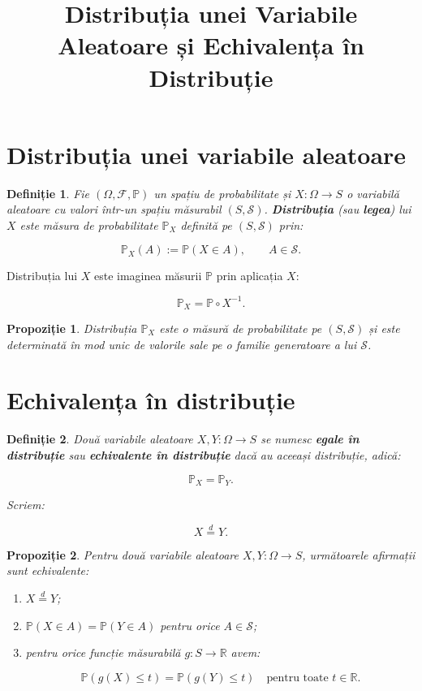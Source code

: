 \documentclass[12pt]{article}
\title{Distribuția unei Variabile Aleatoare și Echivalența în Distribuție}
\author{}
\date{}
\theoremstyle{plain}
\newtheorem{definition}{Definiție}
\newtheorem{proposition}{Propoziție}
\begin{document}
\maketitle

\section{Distribuția unei variabile aleatoare}

\begin{definition}
Fie $(\Omega, \mathcal{F}, \mathbb{P})$ un spațiu de probabilitate și
$X : \Omega \to S$ o variabilă aleatoare cu valori într-un spațiu măsurabil
$(S, \mathscr{S})$.
\textbf{Distribuția} (sau \textbf{legea}) lui $X$ este măsura de probabilitate
$\mathbb{P}_X$ definită pe $(S, \mathscr{S})$ prin:


\[
\mathbb{P}_X(A) := \mathbb{P}(X \in A),
\qquad A \in \mathscr{S}.
\]


\end{definition}

Distribuția lui $X$ este imaginea măsurii $\mathbb{P}$ prin aplicația $X$:


\[
\mathbb{P}_X = \mathbb{P} \circ X^{-1}.
\]



\begin{proposition}
Distribuția $\mathbb{P}_X$ este o măsură de probabilitate pe
$(S, \mathscr{S})$ și este determinată în mod unic de valorile sale pe
o familie generatoare a lui $\mathscr{S}$.
\end{proposition}

\section{Echivalența în distribuție}

\begin{definition}
Două variabile aleatoare $X, Y : \Omega \to S$ se numesc
\textbf{egale în distribuție} sau \textbf{echivalente în distribuție} dacă
au aceeași distribuție, adică:


\[
\mathbb{P}_X = \mathbb{P}_Y.
\]


Scriem:


\[
X \overset{d}{=} Y.
\]


\end{definition}

\begin{proposition}
Pentru două variabile aleatoare $X, Y : \Omega \to S$, următoarele afirmații sunt echivalente:
\begin{enumerate}
    \item $X \overset{d}{=} Y$;
    \item $\mathbb{P}(X \in A) = \mathbb{P}(Y \in A)$ pentru orice $A \in \mathscr{S}$;
    \item pentru orice funcție măsurabilă $g : S \to \mathbb{R}$ avem:
    

\[
    \mathbb{P}(g(X) \le t) = \mathbb{P}(g(Y) \le t)
    \quad \text{pentru toate } t \in \mathbb{R}.
    \]


\end{enumerate}
\end{proposition}
\end{document}
